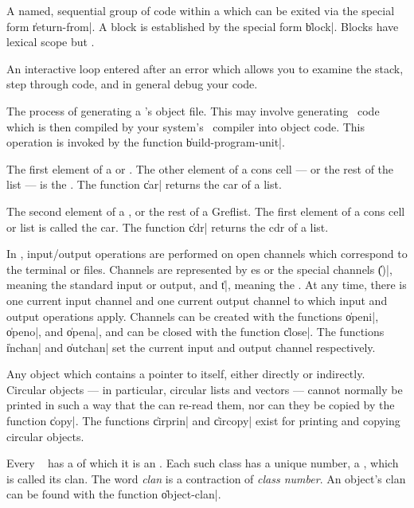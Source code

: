 \begin{description}
	{A named, sequential group of code within a  which can be exited via the special form
	\|return-from|.  A block is established by the special form
	\|block|.  Blocks have lexical scope but .}

	{An interactive loop entered after an error which allows you
	to examine the stack, step through code, and in general debug
	your code.}

	{The process of generating a 's object
	file.  This may involve generating \langc\ code which is then
	compiled by your system's \langc\ compiler into object code.
	This operation is invoked by the function
	\|build-program-unit|.}

	{The first element of a  or .  The
	other element of a cons cell --- or the rest of the list ---
	is the .  The function \|car| returns the car of a
	list.}

	{The second element of a , or the rest of a
	Gref{list}.  The first element of a cons cell or list is
	called the car.  The function \|cdr| returns the cdr of a
	list.}

	{In \Talk, input/output operations are performed on open
	channels which correspond to the terminal or files.  Channels
	are represented by es or the special channels \|()|,
	meaning the standard input or output, and \|t|, meaning the
	.  At any time, there is one current
	input channel and one current output channel to which input
	and output operations apply.  Channels can be created with the
	functions \|openi|, \|openo|, and \|opena|, and can be closed
	with the function \|close|.  The functions \|inchan| and
	\|outchan| set the current input and output channel
	respectively.}

	{Any object which contains a pointer to itself, either
	directly or indirectly.  Circular objects --- in particular,
	circular lists and vectors --- cannot normally be printed in
	such a way that the  can re-read them, nor can
	they be copied by the function \|copy|.  The functions
	\|cirprin| and \|circopy| exist for printing and copying
	circular objects.}

	{Every \Talk\  has a  of which it is
	an .  Each such class has a unique number, a
	, which is called its clan.  The word {\em clan} is
	a contraction of {\em class number}.  An object's clan can be
	found with the function \|object-clan|.}


\end{description}
